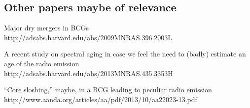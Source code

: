\documentclass[useAMS,usenatbib]{emulateapj}
\newcommand{\src}{BCG\,2261}
\begin{document}





\subsection{Other papers maybe of relevance}
Major dry mergers in BCGs\\
http://adsabs.harvard.edu/abs/2009MNRAS.396.2003L

A recent study on spectral aging in case we feel the need to (badly) estimate an age of the radio emission\\
http://adsabs.harvard.edu/abs/2013MNRAS.435.3353H

``Core sloshing,'' maybe, in a BCG leading to peculiar radio emission\\
http://www.aanda.org/articles/aa/pdf/2013/10/aa22023-13.pdf



\end{document}
